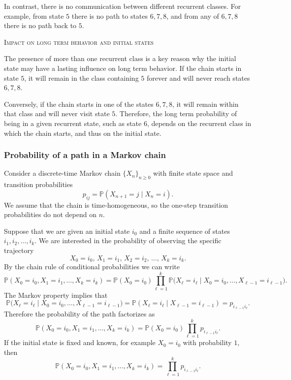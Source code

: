 In contrast, there is no communication between different recurrent classes.
For example, from state \(5\) there is no path to states \(6,7,8\), and from any of \(6,7,8\) there is no path back to \(5\).

\bigskip
\textsc{Impact on long term behavior and initial states}

The presence of more than one recurrent class is a key reason why the initial state may have a lasting influence on long term behavior.
If the chain starts in state \(5\), it will remain in the class containing \(5\) forever and will never reach states \(6,7,8\).

Conversely, if the chain starts in one of the states \(6,7,8\), it will remain within that class and will never visit state \(5\).
Therefore, the long term probability of being in a given recurrent state, such as state \(6\), depends on the recurrent class in which the chain starts, and thus on the initial state.





\subsubsection{Probability of a path in a Markov chain}

Consider a discrete-time Markov chain \(\{X_n\}_{n \ge 0}\) with finite state space and transition probabilities
\[
p_{ij}
=
\mathbb{P}(X_{n+1} = j \mid X_n = i).
\]
We assume that the chain is time-homogeneous, so the one-step transition probabilities do not depend on \(n\).

Suppose that we are given an initial state \(i_0\) and a finite sequence of states \(i_1, i_2, \dots, i_k\).
We are interested in the probability of observing the specific trajectory
\[
X_0 = i_0, \,
X_1 = i_1, \,
X_2 = i_2, \,
\dots, \,
X_k = i_k.
\]
By the chain rule of conditional probabilities we can write
\[
\mathbb{P}(X_0 = i_0, X_1 = i_1, \dots, X_k = i_k)
=
\mathbb{P}(X_0 = i_0)
\prod_{\ell = 1}^{k}
\mathbb{P}\big(X_{\ell} = i_{\ell} \mid X_0 = i_0, \dots, X_{\ell-1} = i_{\ell-1}\big).
\]
The Markov property implies that
\[
\mathbb{P}\big(X_{\ell} = i_{\ell} \mid X_0 = i_0, \dots, X_{\ell-1} = i_{\ell-1}\big)
=
\mathbb{P}(X_{\ell} = i_{\ell} \mid X_{\ell-1} = i_{\ell-1})
=
p_{i_{\ell-1} i_{\ell}}.
\]
Therefore the probability of the path factorizes as
\[
\mathbb{P}(X_0 = i_0, X_1 = i_1, \dots, X_k = i_k)
=
\mathbb{P}(X_0 = i_0)
\prod_{\ell = 1}^{k} p_{i_{\ell-1} i_{\ell}}.
\]
If the initial state is fixed and known, for example \(X_0 = i_0\) with probability \(1\), then
\[
\mathbb{P}(X_0 = i_0, X_1 = i_1, \dots, X_k = i_k)
=
\prod_{\ell = 1}^{k} p_{i_{\ell-1} i_{\ell}}.
\]


